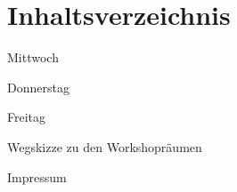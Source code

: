 \section*{Inhaltsverzeichnis}


\vspace*{0.35em}%
\noindent Mittwoch \dotfill \pageref{mittwoch}

\vspace*{0.35em}%
\noindent Donnerstag \dotfill \pageref{donnerstag}

\vspace*{0.35em}%
\noindent Freitag \dotfill \pageref{freitag}

\vspace*{0.35em}%
\noindent Wegskizze zu den Workshopräumen \dotfill \pageref{karte}

\vspace*{0.35em}%
\noindent Impressum \dotfill \pageref{impressum}\\

%

